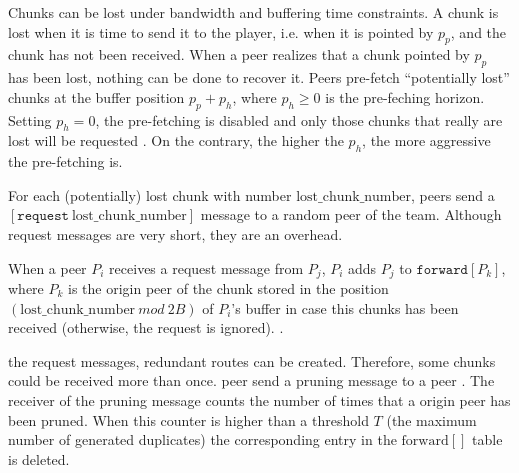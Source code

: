 

\label{sec:routes_discovery}

Chunks can be lost under bandwidth and buffering time constraints. A
chunk is lost when it is time to send it to the player, i.e. when it
is pointed by $p_p$, and the chunk has not been received.  When a peer
realizes that a chunk pointed by $p_p$ has been lost, nothing can be
done to recover it. Peers pre-fetch ``potentially lost'' chunks at the
buffer position $p_p+p_h$, where $p_h\geq 0$ is the pre-feching
horizon. Setting $p_h=0$, the pre-fetching is disabled and only those
chunks that really are lost will be requested .  
  On the contrary, the higher the $p_h$, the more
aggressive the pre-fetching is.

For each (potentially) lost chunk with number
$\text{lost\_chunk\_number}$, peers send a
$[\mathtt{request}~\text{lost\_chunk\_number}]$ message to a random
peer of the team.   Although request messages are very short, they are an overhead.

When a peer $P_i$ receives a request message from $P_j$, $P_i$ adds $P_j$ to
$\mathtt{forward}[P_k]$, where $P_k$ is the origin peer of the chunk
stored in the position $(\text{lost\_chunk\_number}~\mathit{mod}~2B)$
of $P_i$'s buffer in case this chunks has been received (otherwise,
the request is ignored). . 

 the request messages, redundant routes can be created. Therefore, some chunks could be received more than once.  peer send a pruning message to a peer . The receiver of the pruning message counts the number of times that a origin peer has
been  pruned. When this counter is higher than a threshold $T$ (the
maximum number of generated duplicates) the corresponding entry in the $\text{forward}[]$ table is deleted.

